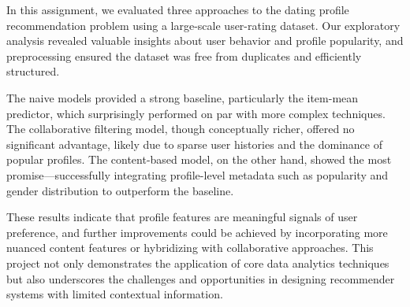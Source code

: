 In this assignment, we evaluated three approaches to the dating profile recommendation problem using a large-scale user-rating dataset. Our exploratory analysis revealed valuable insights about user behavior and profile popularity, and preprocessing ensured the dataset was free from duplicates and efficiently structured.

The naive models provided a strong baseline, particularly the item-mean predictor, which surprisingly performed on par with more complex techniques. The collaborative filtering model, though conceptually richer, offered no significant advantage, likely due to sparse user histories and the dominance of popular profiles. The content-based model, on the other hand, showed the most promise—successfully integrating profile-level metadata such as popularity and gender distribution to outperform the baseline.

These results indicate that profile features are meaningful signals of user preference, and further improvements could be achieved by incorporating more nuanced content features or hybridizing with collaborative approaches. This project not only demonstrates the application of core data analytics techniques but also underscores the challenges and opportunities in designing recommender systems with limited contextual information.